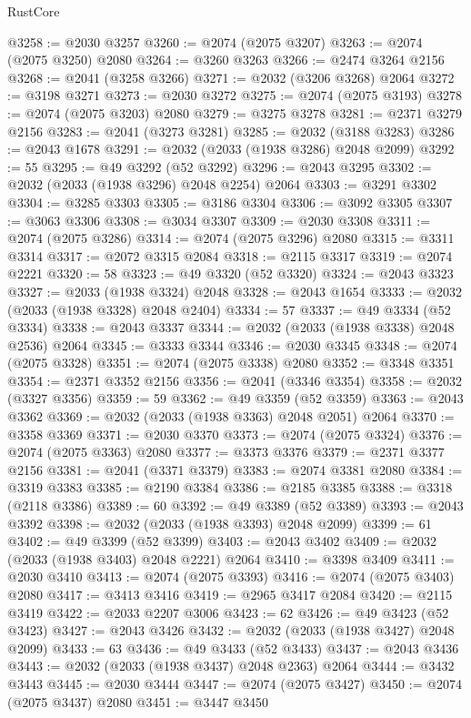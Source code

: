 \begin{lexlean}{RustCore}
\begin{coremodule}
@3258 := @2030 @3257
@3260 := @2074 (@2075 @3207)
@3263 := @2074 (@2075 @3250) @2080
@3264 := @3260 @3263
@3266 := @2474 @3264 @2156
@3268 := @2041 (@3258 @3266)
@3271 := @2032 (@3206 @3268) @2064
@3272 := @3198 @3271
@3273 := @2030 @3272
@3275 := @2074 (@2075 @3193)
@3278 := @2074 (@2075 @3203) @2080
@3279 := @3275 @3278
@3281 := @2371 @3279 @2156
@3283 := @2041 (@3273 @3281)
@3285 := @2032 (@3188 @3283)
@3286 := @2043 @1678
@3291 := @2032 (@2033 (@1938 @3286) @2048 @2099)
@3292 := 55
@3295 := @49 @3292 (@52 @3292)
@3296 := @2043 @3295
@3302 := @2032 (@2033 (@1938 @3296) @2048 @2254) @2064
@3303 := @3291 @3302
@3304 := @3285 @3303
@3305 := @3186 @3304
@3306 := @3092 @3305
@3307 := @3063 @3306
@3308 := @3034 @3307
@3309 := @2030 @3308
@3311 := @2074 (@2075 @3286)
@3314 := @2074 (@2075 @3296) @2080
@3315 := @3311 @3314
@3317 := @2072 @3315 @2084
@3318 := @2115 @3317
@3319 := @2074 @2221
@3320 := 58
@3323 := @49 @3320 (@52 @3320)
@3324 := @2043 @3323
@3327 := @2033 (@1938 @3324) @2048
@3328 := @2043 @1654
@3333 := @2032 (@2033 (@1938 @3328) @2048 @2404)
@3334 := 57
@3337 := @49 @3334 (@52 @3334)
@3338 := @2043 @3337
@3344 := @2032 (@2033 (@1938 @3338) @2048 @2536) @2064
@3345 := @3333 @3344
@3346 := @2030 @3345
@3348 := @2074 (@2075 @3328)
@3351 := @2074 (@2075 @3338) @2080
@3352 := @3348 @3351
@3354 := @2371 @3352 @2156
@3356 := @2041 (@3346 @3354)
@3358 := @2032 (@3327 @3356)
@3359 := 59
@3362 := @49 @3359 (@52 @3359)
@3363 := @2043 @3362
@3369 := @2032 (@2033 (@1938 @3363) @2048 @2051) @2064
@3370 := @3358 @3369
@3371 := @2030 @3370
@3373 := @2074 (@2075 @3324)
@3376 := @2074 (@2075 @3363) @2080
@3377 := @3373 @3376
@3379 := @2371 @3377 @2156
@3381 := @2041 (@3371 @3379)
@3383 := @2074 @3381 @2080
@3384 := @3319 @3383
@3385 := @2190 @3384
@3386 := @2185 @3385
@3388 := @3318 (@2118 @3386)
@3389 := 60
@3392 := @49 @3389 (@52 @3389)
@3393 := @2043 @3392
@3398 := @2032 (@2033 (@1938 @3393) @2048 @2099)
@3399 := 61
@3402 := @49 @3399 (@52 @3399)
@3403 := @2043 @3402
@3409 := @2032 (@2033 (@1938 @3403) @2048 @2221) @2064
@3410 := @3398 @3409
@3411 := @2030 @3410
@3413 := @2074 (@2075 @3393)
@3416 := @2074 (@2075 @3403) @2080
@3417 := @3413 @3416
@3419 := @2965 @3417 @2084
@3420 := @2115 @3419
@3422 := @2033 @2207 @3006
@3423 := 62
@3426 := @49 @3423 (@52 @3423)
@3427 := @2043 @3426
@3432 := @2032 (@2033 (@1938 @3427) @2048 @2099)
@3433 := 63
@3436 := @49 @3433 (@52 @3433)
@3437 := @2043 @3436
@3443 := @2032 (@2033 (@1938 @3437) @2048 @2363) @2064
@3444 := @3432 @3443
@3445 := @2030 @3444
@3447 := @2074 (@2075 @3427)
@3450 := @2074 (@2075 @3437) @2080
@3451 := @3447 @3450

\end{coremodule}
\end{lexlean}
